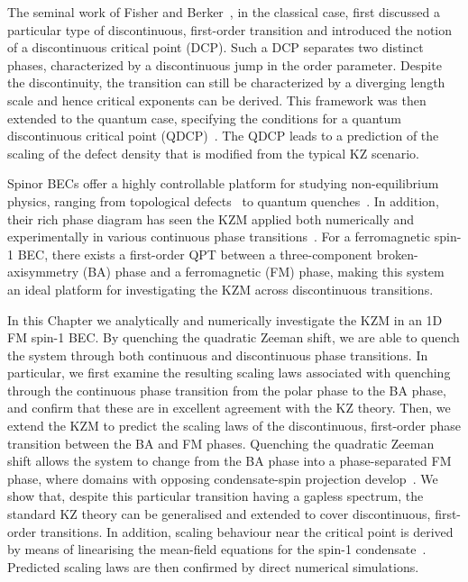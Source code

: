 The seminal work of Fisher and Berker~\cite{Fisher1982}, in the classical case,
first discussed a particular type of discontinuous, first-order transition and
introduced the notion of a discontinuous critical point (DCP).
Such a DCP separates two distinct phases, characterized by a discontinuous jump
in the order parameter.
Despite the discontinuity, the transition can still be characterized by a
diverging length scale and hence critical exponents can be derived.
This framework was then extended to the quantum case, specifying the conditions
for a quantum discontinuous critical point (QDCP)~\cite{Suzuki2015}.
The QDCP leads to a prediction of the scaling of the defect density that is
modified from the typical KZ scenario.

Spinor BECs offer a highly controllable platform for studying non-equilibrium
physics, ranging from topological defects~\cite{Lovegrove2014, Borgh2016} to
quantum quenches~\cite{Symes2017, Prufer2018, Schmied2019}.
In addition, their rich phase diagram has seen the KZM applied both numerically
and experimentally in various continuous phase transitions~\cite{Damski2007,
    Saito2007, Saito2007a, Swislocki2013, Witkowska2013, Anquez2016}.
For a ferromagnetic spin-1 BEC, there exists a first-order QPT between a
three-component broken-axisymmetry (BA) phase and a ferromagnetic (FM) phase,
making this system an ideal platform for investigating the KZM across
discontinuous transitions.

In this Chapter we analytically and numerically investigate the KZM in an 1D FM
spin-1 BEC\@.
By quenching the quadratic Zeeman shift, we are able to quench the system
through both continuous and discontinuous phase transitions.
In particular, we first examine the resulting scaling laws associated with
quenching through the continuous phase transition from the polar phase to the
BA phase, and confirm that these are in excellent agreement with the KZ theory.
Then, we extend the KZM to predict the scaling laws of the discontinuous,
first-order phase transition between the BA and FM phases.
Quenching the quadratic Zeeman shift allows the system to change from the
BA phase into a phase-separated FM phase, where domains with opposing
condensate-spin projection develop~\cite{Kawaguchi2012}.
We show that, despite this particular transition having a gapless spectrum, the
standard KZ theory can be generalised and extended to cover discontinuous,
first-order transitions.
In addition, scaling behaviour near the critical point is derived by means of
linearising the mean-field equations for the spin-1
condensate~\cite{Damski2007, Uchino2010}.
Predicted scaling laws are then confirmed by direct numerical simulations.

